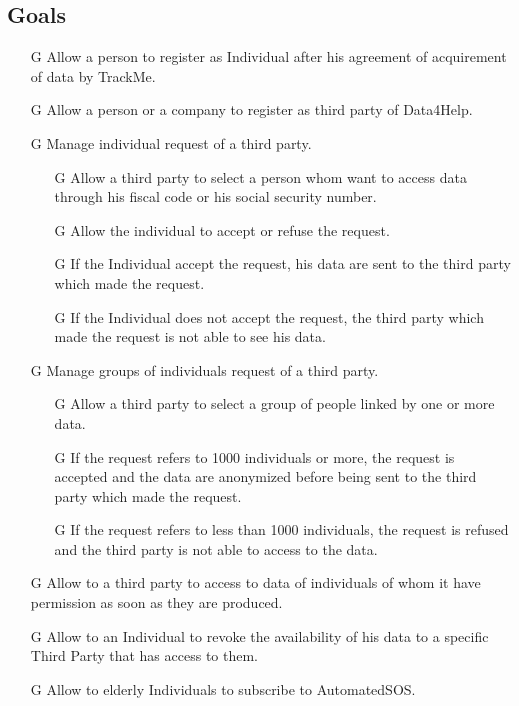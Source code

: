 \documentclass[../../rasd.tex]{subfiles}
\begin{document}
			\subsection{Goals}
			\begin{itemize}
				\item[G\subs{1}]Allow a person to register as Individual after his agreement of acquirement of data by TrackMe.
				
				\item[G\subs{2}]Allow a person or a company to register as third party of Data4Help.

				\item[G\subs{3}]Manage individual request of a third party.
					\begin{itemize}
					\item [G\subs{3.1}]	Allow a third party to select a person whom want to access data through his fiscal code or his social security number.
					\item [G\subs{3.2}]Allow the individual to accept or refuse the request.
					\item [G\subs{3.3}]If the Individual accept the request, his data are sent to the third party which made the request.
					\item [G\subs{3.4}]If the Individual does not accept the request, the third party which made the request is not able to see his data.
					\end{itemize}								
				\item [G\subs{4}]Manage groups of individuals request of a third party.\\
					\begin{itemize}
					\item [G\subs{4.1}]Allow a third party to select a group of people linked by one or more data.
					\item [G\subs{4.2}]If the request refers to 1000 individuals or more, the request is accepted and the data are anonymized before being sent to the third party which made the request.
					\item [G\subs{4.3}]If the request refers to less than 1000 individuals, the request is refused and the third party is not able to access to the data.
					\end{itemize}								
				\item[G\subs{5}]Allow to a third party to access to data of individuals of whom it have permission as soon as they are produced.
				\item[G\subs{6}]Allow to an Individual to revoke the availability of his data to a specific Third Party that has access to them.
				\item[G\subs{7}]Allow to elderly Individuals to subscribe to AutomatedSOS.
					

\end{itemize}
\end{document}
